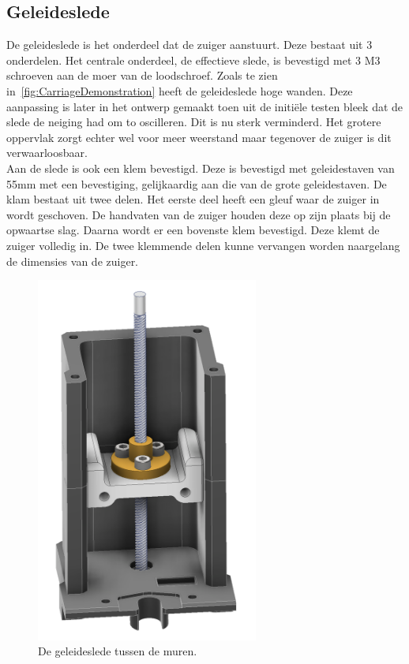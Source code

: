 \subsection{Geleideslede}
De geleideslede is het onderdeel dat de zuiger aanstuurt. Deze bestaat uit 3 onderdelen. Het centrale onderdeel, de effectieve slede, is bevestigd met 3 M3 schroeven aan de moer van de loodschroef. Zoals te zien in\ \autoref{fig:CarriageDemonstration} heeft de geleideslede hoge wanden. Deze aanpassing is later in het ontwerp gemaakt toen uit de initiële testen bleek dat de slede de neiging had om to oscilleren. Dit is nu sterk verminderd. Het grotere oppervlak zorgt echter wel voor meer weerstand maar tegenover de zuiger is dit verwaarloosbaar.
\\[12pt]Aan de slede is ook een klem bevestigd. Deze is bevestigd met geleidestaven van 55mm met een bevestiging, gelijkaardig aan die van de grote geleidestaven. De klam bestaat uit twee delen. Het eerste deel heeft een gleuf waar de zuiger in wordt geschoven. De handvaten van de zuiger houden deze op zijn plaats bij de opwaartse slag. Daarna wordt er een bovenste klem bevestigd. Deze klemt de zuiger volledig in. De twee klemmende delen kunne vervangen worden naargelang de dimensies van de zuiger.
\\[12pt]\begin{minipage}[t]{0.39\textwidth}
    \vspace{0pt}
    \begin{figure}[H]
        \centering
        \includegraphics[width=0.65\textwidth]{figures/CarriageDemonstration.png}
        \caption{De geleideslede tussen de muren.}\label{fig:CarriageDemonstration}
    \end{figure}
\end{minipage}
